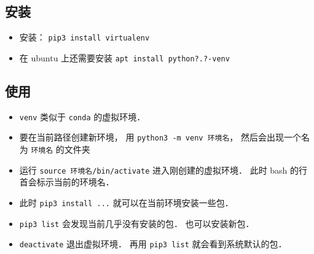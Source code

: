 
\begin{issues}
\issueDraft
\end{issues}

\subsection{安装}
\begin{itemize}
\item 安装： \verb|pip3 install virtualenv|
\item 在 ubuntu 上还需要安装 \verb|apt install python?.?-venv|
\end{itemize}

\subsection{使用}
\begin{itemize}
\item \verb|venv| 类似于 \verb|conda| 的虚拟环境．
\item 要在当前路径创建新环境， 用 \verb|python3 -m venv 环境名|， 然后会出现一个名为 \verb|环境名| 的文件夹
\item 运行 \verb|source 环境名/bin/activate| 进入刚创建的虚拟环境． 此时 bash 的行首会标示当前的环境名．
\item 此时 \verb|pip3 install ...| 就可以在当前环境安装一些包．
\item \verb|pip3 list| 会发现当前几乎没有安装的包． 也可以安装新包．
\item \verb|deactivate| 退出虚拟环境． 再用 \verb|pip3 list| 就会看到系统默认的包．
\end{itemize}
